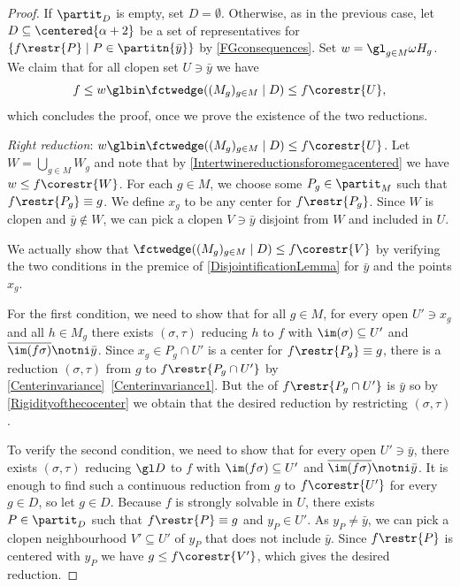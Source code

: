 \begin{proof}
If $\partit_D$ is empty, set $D=\emptyset$. Otherwise, as in the previous case, let $D\subseteq \centered{\alpha+2}$ be a set of representatives for $\{f\restr{P}\mid P\in \partitn{\bar{y}}\}$
by \cref{FGconsequences}. Set $w=\gl_{g\in M} \omega H_g$. We claim that for all clopen set $U\ni \bar{y}$ we have
\[
f\leq w \glbin \fctwedge((M_g)_{ g\in M}\mid D) \leq f\corestr{U},
\]
which concludes the proof, once we prove the existence of the two reductions.

\smallskip

\textit{Right reduction}: $ w \glbin \fctwedge((M_g)_{ g\in M}\mid D) \leq f\corestr{U}$.
Let $W=\bigcup_{g\in M}W_g$ and note that by \cref{Intertwinereductionsforomegacentered} we have $w\leq f\corestr{W}$.
For each $g\in M$, we choose some $P_g\in\partit_M$ such that $f\restr{P_g}\equiv g$. We define $x_g$ to be any center for $f\restr{P_g}$.
Since $W$ is clopen and $\bar{y}\notin W$, we can pick a clopen $V\ni \bar{y}$ disjoint from $W$ and included in $U$.

We actually show that $\fctwedge((M_g)_{ g\in M}\mid D) \leq f\corestr{V}$ by verifying
the two conditions in the premice of \cref{DisjointificationLemma} for $\bar{y}$ and the points $x_g$.  

For the first condition, we need to show that for all $g\in M$, for every open $U'\ni x_g$ and all $h\in M_g$
there exists $(\sigma,\tau)$ reducing $h$ to $f$ with $\im(\sigma)\subseteq U'$ and $\overline{\im(f\sigma)}\notni \bar{y}$.
{Since $x_g\in P_g\cap U'$ is a center for $f\restr{P_g}\equiv g$, there is a reduction $(\sigma,\tau)$ from $g$ to $f\restr{P_g\cap U'}$ by \cref{Centerinvariance}~\cref{Centerinvariance1}.
But the \cocenter{} of $f\restr{P_g\cap U'}$ is $\bar{y}$ so by \cref{Rigidityofthecocenter} we obtain that the desired reduction by restricting $(\sigma,\tau)$.  %
}
 
To verify the second condition, we need to show that
for every open $U'\ni \bar{y}$, there exists $(\sigma,\tau)$ reducing $\gl D$ to $f$ with $\im(f\sigma)\subseteq U'$ and $\overline{\im(f\sigma)}\notni \bar{y}$.
It is enough to find such a continuous reduction from $g$ to $f\corestr{U'}$ for every $g\in D$, so let $g\in D$.
Because $f$ is strongly solvable in $U$, there exists $P\in\partit_D$ such that $f\restr{P}\equiv g$ and $y_P\in U'$.
As $y_P\neq \bar{y}$, we can pick a clopen neighbourhood $V'\subseteq U'$ of $y_P$ that does not include $\bar{y}$.
Since $f\restr{P}$ is centered with \cocenter{} $y_P$ we have $g\leq f\corestr{V'}$, which gives the desired reduction. 


\end{proof}
